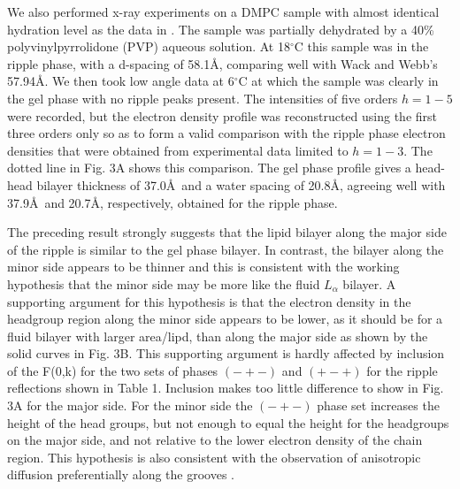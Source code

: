 We also performed x-ray experiments on a DMPC sample with almost identical
hydration level as the data in \cite{Wac89a}. 
The sample was partially dehydrated by a 40\% polyvinylpyrrolidone
(PVP) aqueous solution.  At 18$^{\circ}$C
this sample was in the ripple phase, with a d-spacing of 58.1\AA, comparing 
well with Wack and Webb's 57.94\AA.  We then took
low angle data at 6$^{\circ}$C at which the sample was clearly in the
gel phase with no ripple peaks present. The intensities of five orders 
$h=1-5$ were
recorded, but the electron density profile was reconstructed using
the first three orders only so as to form a valid comparison 
with the ripple phase electron densities that were obtained from 
experimental data limited to $h=1-3$.  
The dotted line in Fig. 3A shows this comparison.
The gel phase profile gives a head-head bilayer thickness of 37.0\AA\ and
a water spacing of 20.8\AA, agreeing well with 37.9\AA\ and 20.7\AA,
respectively, obtained for the ripple phase.

The preceding result strongly suggests that the lipid bilayer along the major
side of the ripple is similar to the gel phase bilayer.
In contrast, the bilayer along the minor side appears to be
thinner and this is consistent with the working hypothesis
that the minor side may be more like the fluid $L_{\alpha}$ bilayer.
A supporting argument for this hypothesis is that the electron density 
in the headgroup region along the minor side appears to be lower,
as it should be for a fluid bilayer with larger area/lipd, than 
along the major side as shown by the solid curves in Fig. 3B.
This supporting argument is hardly affected by inclusion of the
F(0,k) for the two sets of phases $(-+-)$ and $(+-+)$ for the ripple 
reflections shown in Table 1.  Inclusion makes too little difference 
to show in Fig. 3A for the major side.  For the minor side the 
$(-+-)$ phase set increases the height of the head groups, but not
enough to equal the height for the headgroups on the
major side, and not relative to the lower electron density of the 
chain region.  This hypothesis is also consistent with the observation of 
anisotropic diffusion preferentially along the grooves \cite{SCM83}.

